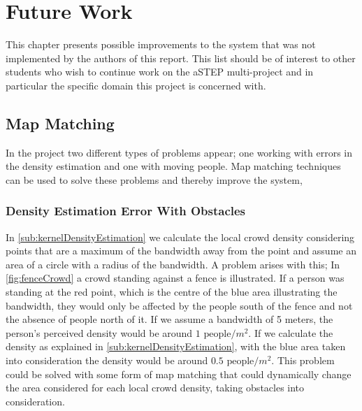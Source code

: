 \chapter{Future Work}\label{ch:future_work}

This chapter presents possible improvements to the system that was not implemented by the authors of this report. This list should be of interest to other students who wish to continue work on the aSTEP multi-project and in particular the specific domain this project is concerned with.

\section{Map Matching}
In the project two different types of problems appear; one working with errors in the density estimation and one with moving people. Map matching techniques can be used to solve these problems and thereby improve the system,

\subsection{Density Estimation Error With Obstacles}
In \cref{sub:kernelDensityEstimation} we calculate the local crowd density considering points that are a maximum of the bandwidth away from the point and assume an area of a circle with a radius of the bandwidth. A problem arises with this; In \cref{fig:fenceCrowd} a crowd standing against a fence is illustrated. If a person was standing at the red point, which is the centre of the blue area illustrating the bandwidth, they would only be affected by the people south of the fence and not the absence of people north of it. If we assume a bandwidth of 5 meters, the person's perceived density would be around $1 \text{ people} / m^2$. If we calculate the density as explained in \cref{sub:kernelDensityEstimation}, with the blue area taken into consideration the density would be around $0.5 \text{ people} / m^2$.
This problem could be solved with some form of map matching that could dynamically change the area considered for each local crowd density, taking obstacles into consideration.

